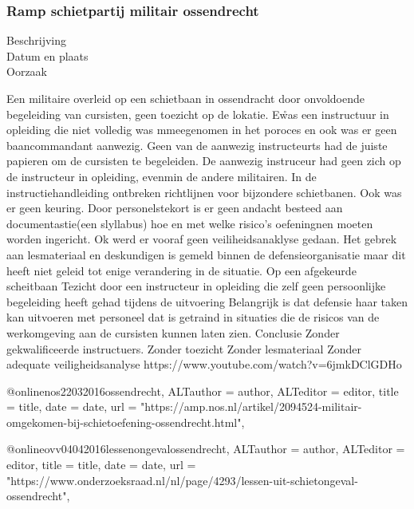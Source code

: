 {{\subsubsection{Ramp schietpartij militair ossendrecht }

\begin{description}
\item[Beschrijving]
\item[Datum en plaats] 
\item[Oorzaak]
\end{description}
Een militaire overleid op een schietbaan in ossendracht door onvoldoende begeleiding van cursisten, geen toezicht op de lokatie. E\r was een instructuur in opleiding die niet volledig was mmeegenomen in het poroces en ook was er geen baancommandant aanwezig. Geen van de aanwezig instructeurts had de juiste papieren om de cursisten te begeleiden. De aanwezig instruceur had geen zich op de instructeur in opleiding, evenmin de andere militairen. In de instructiehandleiding ontbreken richtlijnen voor bijzondere schietbanen. Ook was er geen keuring. Door personelstekort is er geen andacht besteed aan documentastie(een slyllabus) hoe en met welke risico’s oefeningnen moeten worden ingericht. Ok werd er vooraf geen veiliheidsanaklyse gedaan. Het gebrek aan lesmateriaal en deskundigen is gemeld binnen de defensieorganisatie maar dit heeft niet geleid tot enige verandering in de situatie.
Op een afgekeurde scheitbaan
Tezicht door een instructeur in opleiding die zelf geen persoonlijke begeleiding heeft gehad tijdens de uitvoering
Belangrijk is dat defensie haar taken kan uitvoeren met personeel dat is getraind in situaties die de risicos van de werkomgeving aan de cursisten kunnen laten zien.
Conclusie
Zonder gekwalificeerde instructuers.
Zonder toezicht
Zonder lesmateriaal
Zonder adequate veiligheidsanalyse
https://www.youtube.com/watch?v=6jmkDClGDHo 
\cite{oVVSchietongevalOssendrecht}



@online{nos22032016ossendrecht,	ALTauthor = {author},	ALTeditor = {editor},	title = {title},	date = {date},	url = {"https://amp.nos.nl/artikel/2094524-militair-omgekomen-bij-schietoefening-ossendrecht.html"},}

@online{ovv04042016lessenongevalossendrecht,	ALTauthor = {author},	ALTeditor = {editor},	title = {title},	date = {date},	url = {"https://www.onderzoeksraad.nl/nl/page/4293/lessen-uit-schietongeval-ossendrecht"},}

}}

